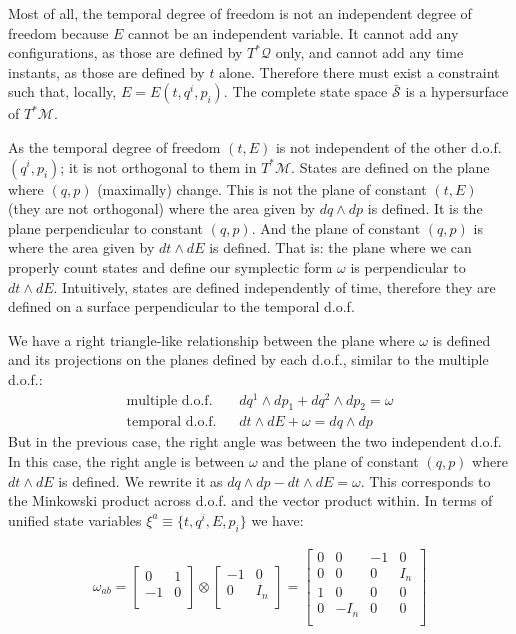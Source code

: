 \documentclass[smallextended]{svjour3}
\numberwithin{equation}{section}
\theoremstyle{definition}
\begin{document}
Most of all, the temporal degree of freedom is not an independent degree of freedom because $E$ cannot be an independent variable. It cannot add any configurations, as those are defined by $T^*\mathcal{Q}$ only, and cannot add any time instants, as those are defined by $t$ alone. Therefore there must exist a constraint such that, locally, $E=E(t,q^i,p_i)$. The complete state space $\bar{\mathcal{S}}$ is a hypersurface of $T^*\mathcal{M}$.

As the temporal degree of freedom $(t, E)$ is not independent of the other d.o.f.~$(q^i, p_i)$; it is not orthogonal to them in $T^*\mathcal{M}$. States are defined on the plane where $( q, p )$ (maximally) change. This is not the plane of constant $( t, E )$ (they are not orthogonal) where the area given by $dq \wedge dp$ is defined. It is the plane perpendicular to constant $( q, p )$. And the plane of constant $( q, p )$ is where the area given by $dt \wedge dE$ is defined. That is: the plane where we can properly count states and define our symplectic form $\omega$ is perpendicular to $dt \wedge dE$. Intuitively, states are defined independently of time, therefore they are defined on a surface perpendicular to the temporal d.o.f.

We have a right triangle-like relationship between the plane where $\omega$ is defined and its projections on the planes defined by each d.o.f., similar to the multiple d.o.f.:
\begin{align*}
\textrm{multiple d.o.f.} \;\;\; &dq^1 \wedge dp_1 + dq^2 \wedge dp_2 = \omega \\
\textrm{temporal d.o.f.} \;\;\; &dt \wedge dE + \omega = dq \wedge dp
\end{align*}
But in the previous case, the right angle was between the two independent d.o.f. In this case, the right angle is between $\omega$ and the plane of constant $(q, p)$ where $dt \wedge dE$ is defined. We rewrite it as $dq \wedge dp - dt \wedge dE = \omega$. This corresponds to the Minkowski product across d.o.f. and the vector product within. In terms of unified state variables $\xi^a\equiv \{t, q^i, E, p_i\}$ we have:

\begin{align*}
\omega_{ab} =  \left[
\begin{array}{cc}
0 & 1 \\
-1 & 0 \\
\end{array}
\right] \otimes \left[
\begin{array}{cc}
-1 & 0 \\
0 & I_n \\
\end{array}
\right] =
\left[
\begin{array}{cccc}
0 & 0 & -1 & 0 \\
0 & 0 & 0 & I_n \\
1 & 0 & 0 & 0 \\
0 & -I_n & 0& 0 \\
\end{array}
\right] \\
\end{align*}
\end{document}
